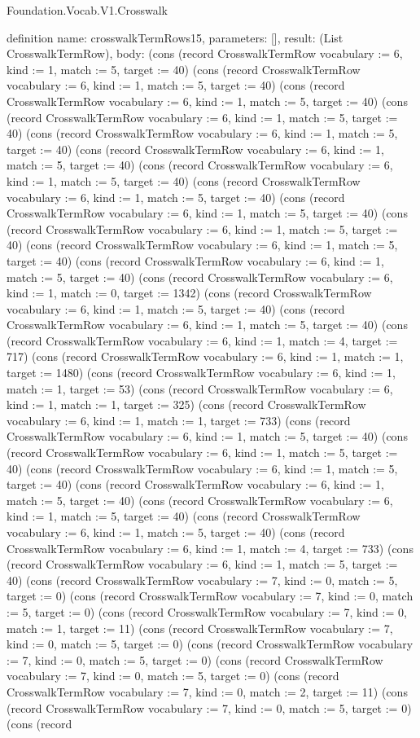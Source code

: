 \begin{lexlean}{Foundation.Vocab.V1.Crosswalk}
\begin{semanticmodule}
definition{
  name: crosswalkTermRows15,
  parameters: [],
  result: (List CrosswalkTermRow),
  body: (cons (record CrosswalkTermRow {vocabulary := 6, kind := 1, match := 5, target := 40}) (cons (record CrosswalkTermRow {vocabulary := 6, kind := 1, match := 5, target := 40}) (cons (record CrosswalkTermRow {vocabulary := 6, kind := 1, match := 5, target := 40}) (cons (record CrosswalkTermRow {vocabulary := 6, kind := 1, match := 5, target := 40}) (cons (record CrosswalkTermRow {vocabulary := 6, kind := 1, match := 5, target := 40}) (cons (record CrosswalkTermRow {vocabulary := 6, kind := 1, match := 5, target := 40}) (cons (record CrosswalkTermRow {vocabulary := 6, kind := 1, match := 5, target := 40}) (cons (record CrosswalkTermRow {vocabulary := 6, kind := 1, match := 5, target := 40}) (cons (record CrosswalkTermRow {vocabulary := 6, kind := 1, match := 5, target := 40}) (cons (record CrosswalkTermRow {vocabulary := 6, kind := 1, match := 5, target := 40}) (cons (record CrosswalkTermRow {vocabulary := 6, kind := 1, match := 5, target := 40}) (cons (record CrosswalkTermRow {vocabulary := 6, kind := 1, match := 5, target := 40}) (cons (record CrosswalkTermRow {vocabulary := 6, kind := 1, match := 0, target := 1342}) (cons (record CrosswalkTermRow {vocabulary := 6, kind := 1, match := 5, target := 40}) (cons (record CrosswalkTermRow {vocabulary := 6, kind := 1, match := 5, target := 40}) (cons (record CrosswalkTermRow {vocabulary := 6, kind := 1, match := 4, target := 717}) (cons (record CrosswalkTermRow {vocabulary := 6, kind := 1, match := 1, target := 1480}) (cons (record CrosswalkTermRow {vocabulary := 6, kind := 1, match := 1, target := 53}) (cons (record CrosswalkTermRow {vocabulary := 6, kind := 1, match := 1, target := 325}) (cons (record CrosswalkTermRow {vocabulary := 6, kind := 1, match := 1, target := 733}) (cons (record CrosswalkTermRow {vocabulary := 6, kind := 1, match := 5, target := 40}) (cons (record CrosswalkTermRow {vocabulary := 6, kind := 1, match := 5, target := 40}) (cons (record CrosswalkTermRow {vocabulary := 6, kind := 1, match := 5, target := 40}) (cons (record CrosswalkTermRow {vocabulary := 6, kind := 1, match := 5, target := 40}) (cons (record CrosswalkTermRow {vocabulary := 6, kind := 1, match := 5, target := 40}) (cons (record CrosswalkTermRow {vocabulary := 6, kind := 1, match := 5, target := 40}) (cons (record CrosswalkTermRow {vocabulary := 6, kind := 1, match := 4, target := 733}) (cons (record CrosswalkTermRow {vocabulary := 6, kind := 1, match := 5, target := 40}) (cons (record CrosswalkTermRow {vocabulary := 7, kind := 0, match := 5, target := 0}) (cons (record CrosswalkTermRow {vocabulary := 7, kind := 0, match := 5, target := 0}) (cons (record CrosswalkTermRow {vocabulary := 7, kind := 0, match := 1, target := 11}) (cons (record CrosswalkTermRow {vocabulary := 7, kind := 0, match := 5, target := 0}) (cons (record CrosswalkTermRow {vocabulary := 7, kind := 0, match := 5, target := 0}) (cons (record CrosswalkTermRow {vocabulary := 7, kind := 0, match := 5, target := 0}) (cons (record CrosswalkTermRow {vocabulary := 7, kind := 0, match := 2, target := 11}) (cons (record CrosswalkTermRow {vocabulary := 7, kind := 0, match := 5, target := 0}) (cons (record }
\end{semanticmodule}
\end{lexlean}

